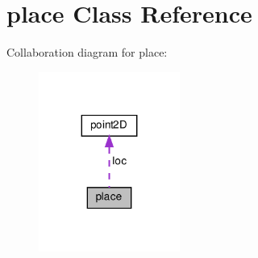 \hypertarget{classplace}{}\section{place Class Reference}
\label{classplace}


Collaboration diagram for place\+:
\nopagebreak
\begin{figure}[H]
\begin{center}
\leavevmode
\includegraphics[width=131pt]{classplace__coll__graph}
\end{center}
\end{figure}
